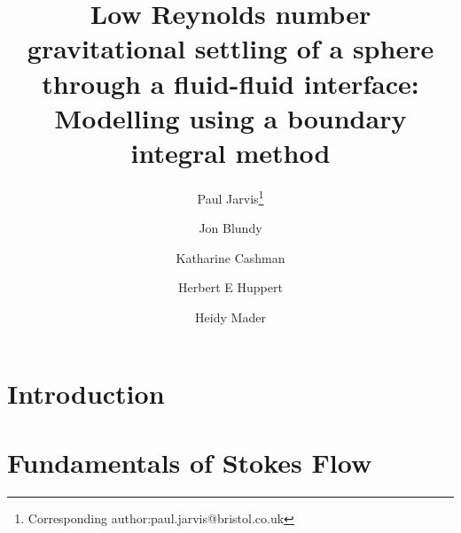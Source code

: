 \documentclass[12pt]{article}
\begin{document}
\thispagestyle{empty}

\title{Low Reynolds number gravitational settling of a sphere through a fluid-fluid interface: Modelling using a boundary integral method}

\author[1]{Paul Jarvis\footnote{Corresponding author:paul.jarvis@bristol.co.uk}}
\author[1]{Jon Blundy}
\author[1]{Katharine Cashman}
\author[1,2]{Herbert E Huppert}
\author[1]{Heidy Mader}
\date{}


\maketitle

\begin{abstract}


\end{abstract}


\section{Introduction}
\label{sec:intro}


\section{Fundamentals of Stokes Flow}
\label{sec:Stokes}
\end{document}
